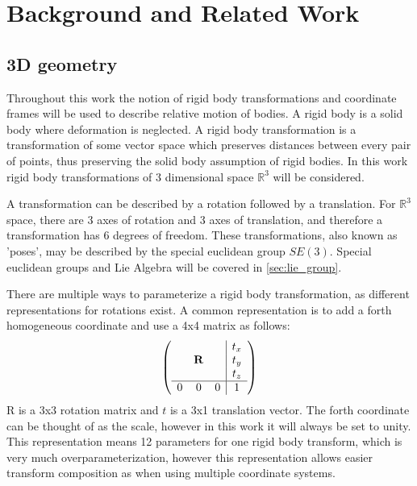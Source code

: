 
\chapter{Background and Related Work}
\label{chapter:Related_Work}


\section{3D geometry}
\label{3D_geometry}

Throughout this work the notion of rigid body transformations and coordinate frames will be used to describe relative motion of bodies.  A rigid body is a solid body where deformation is neglected.  A rigid body transformation is a transformation of some vector space which preserves distances between every pair of points, thus preserving the solid body assumption of rigid bodies. In this work rigid body transformations of 3 dimensional space $\mathbb{R}^3$ will be considered.

A transformation can be described by a rotation followed by a translation.  For $\mathbb{R}^3$ space, there are 3 axes of rotation and 3 axes of translation, and therefore a transformation has 6 degrees of freedom.  These transformations, also known as  'poses', may be described by the special euclidean group $SE(3)$.  Special euclidean groups and Lie Algebra will be covered in \ref{sec:lie_group}.

There are multiple ways to parameterize a rigid body transformation, as different representations for rotations exist.  A common representation is to add a forth homogeneous coordinate and use a 4x4 matrix as follows:
\begin{align}
    \left( 
             \begin{array}{ccc|c}
               &        &   & t_x \\
               & \mathbf{R} &   & t_y \\
               &        &   & t_z \\ \hline
             0 & 0      & 0 & 1 \end{array} \right) 
\end{align}
R is a 3x3 rotation matrix and $t$ is a 3x1 translation vector.  The forth coordinate can be thought of as the scale, however in this work it will always be set to unity.  This representation means 12 parameters for one rigid body transform, which is very much overparameterization, however this representation allows easier transform composition as when using multiple coordinate systems.

